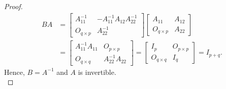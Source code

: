 \documentclass[12pt]{article}
\newenvironment{problem}[2][Problem]{\begin{trivlist} \item[\hskip \labelsep {\bfseries #1}\hskip \labelsep {\bfseries #2.}]}{\end{trivlist}}
\begin{document}
\begin{problem}{1.24}
\begin{proof}
\begin{align*}
  BA &= \begin{bmatrix} A_{11}^{-1} & -A_{11}^{-1}A_{12}A_{22}^{-1}\\ O_{q\times p} & A_{22}^{-1} \end{bmatrix} \begin{bmatrix} A_{11} & A_{12} \\ O_{q\times p} & A_{22}\end{bmatrix}\\
  &= \begin{bmatrix} A_{11}^{-1}A_{11} & O_{p\times p}\\ O_{q\times q} & A_{22}^{-1}A_{22}\end{bmatrix} = \begin{bmatrix} I_{p} & O_{p\times p}\\ O_{q\times q} & I_{q}\end{bmatrix} = I_{p+q}.
\end{align*}
Hence, $B = A^{-1}$ and $A$ is invertible.\\


\end{proof}
\end{problem}
\end{document}
